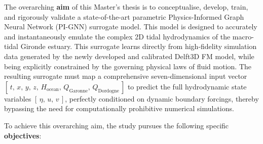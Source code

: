 The overarching \textbf{aim} of this Master's thesis is to conceptualise, develop, train, and
rigorously validate a state-of-the-art parametric Physics-Informed Graph Neural Network
(PI-GNN) surrogate model. This model is designed to accurately and instantaneously emulate the complex 2D tidal hydrodynamics of the
macro-tidal Gironde estuary. This surrogate learns directly from high-fidelity simulation data generated by the newly developed and calibrated Delft3D FM model, while being explicitly constrained by the governing physical laws of fluid motion. The resulting surrogate must map a comprehensive seven-dimensional input vector
$[\,t,\, x,\, y,\, z,\, H_\mathrm{ocean},\, Q_\mathrm{Garonne},\,
Q_\mathrm{Dordogne}\,]$ to predict the full hydrodynamic state variables
$[\,\eta,\, u,\, v\,]$, perfectly conditioned on dynamic boundary forcings, thereby bypassing the need for computationally prohibitive numerical simulations.

To achieve this overarching aim, the study pursues the following specific \textbf{objectives}:

